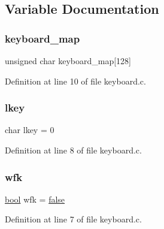 \subsection{Variable Documentation}
\mbox{\label{a00029_a5d0b5e007d1b57bf84d1c03439810533_a5d0b5e007d1b57bf84d1c03439810533}} 
\subsubsection{\texorpdfstring{keyboard\+\_\+map}{keyboard\_map}}
{\footnotesize\ttfamily unsigned char keyboard\+\_\+map\mbox{[}128\mbox{]}}



Definition at line 10 of file keyboard.\+c.

\mbox{\label{a00029_ade374650022cb30c4f5591a8dafad685_ade374650022cb30c4f5591a8dafad685}} 
\subsubsection{\texorpdfstring{lkey}{lkey}}
{\footnotesize\ttfamily char lkey = 0}



Definition at line 8 of file keyboard.\+c.

\mbox{\label{a00029_a6ddd5223379778858edc46ffbec19775_a6ddd5223379778858edc46ffbec19775}} 
\subsubsection{\texorpdfstring{wfk}{wfk}}
{\footnotesize\ttfamily \hyperlink{a00116_af6a258d8f3ee5206d682d799316314b1_af6a258d8f3ee5206d682d799316314b1}{bool} wfk = \hyperlink{a00116_af6a258d8f3ee5206d682d799316314b1_af6a258d8f3ee5206d682d799316314b1ae9de385ef6fe9bf3360d1038396b884c}{false}}



Definition at line 7 of file keyboard.\+c.

